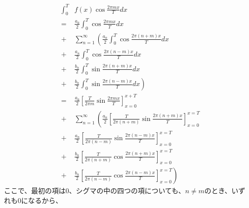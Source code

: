 \documentclass[a4paper]{jsarticle}
\begin{document}
\begin{eqnarray}
	&{\int _0 ^T}& f \left( x \right) \cos \frac { 2 \pi mx } { T } dx \nonumber \\
	&=& \frac { a_0 } { 2 } \int _0 ^T \cos \frac { 2 \pi mx } { T } dx \nonumber \\
	&+& \sum _{ n = 1 } ^\infty \left( \frac { a_n } { 2 } \int _0 ^T \cos \frac { 2 \pi \left( n + m \right) x } { T }  dx \right. \nonumber \\
	&+& \frac { a_n } { 2 } \int _0 ^T \cos \frac { 2 \pi \left( n - m \right) x } { T } dx \nonumber \\
	&+& \frac { b_n } { 2 } \int _0 ^T \sin \frac { 2 \pi \left( n + m \right) x } { T } dx \nonumber \\
	&+& \left. \frac { b_n } { 2 } \int _0 ^T \sin \frac { 2 \pi \left( n - m \right) x } { T } dx \right) \nonumber \\
	&=& \frac { a_0 } { 2 } \left[ \frac { T } { 2 \pi m } \sin \frac { 2 \pi mx } { T } \right] _{ x = 0 } ^{ x + T } \nonumber \\
	&+& \sum _{ n = 1 } ^\infty \left( \frac { a_n } { 2 } \left[ \frac { T } { 2 \pi \left( n + m \right) } \sin \frac { 2 \pi \left( n + m \right) x } { T } \right] _{ x = 0 } ^{ x = T } \right. \nonumber \\
	&+& \frac { a_n } { 2 } \left[ \frac { T } { 2 \pi \left( n - m \right) } \sin \frac { 2 \pi \left( n - m \right) x } { T } \right] _{ x = 0 } ^{ x = T } \nonumber \\
	&+& \frac { b_n } { 2 } \left[ \frac { T } { 2 \pi \left( n + m \right) } \cos \frac { 2 \pi \left( n + m \right) x } { T } \right] _{ x = 0 } ^{ x = T } \nonumber \\
	&+& \left. \frac { b_n } { 2 } \left[ \frac { T } { 2 \pi \left( n - m \right) } \cos \frac { 2 \pi \left( n - m \right) x } { T } \right] _{ x = 0 } ^{ x = T }\right) 
\end{eqnarray}
ここで、最初の項は$0$、シグマの中の四つの項についても、$n \neq m$のとき、いずれも$0$になるから、
\end{document}
